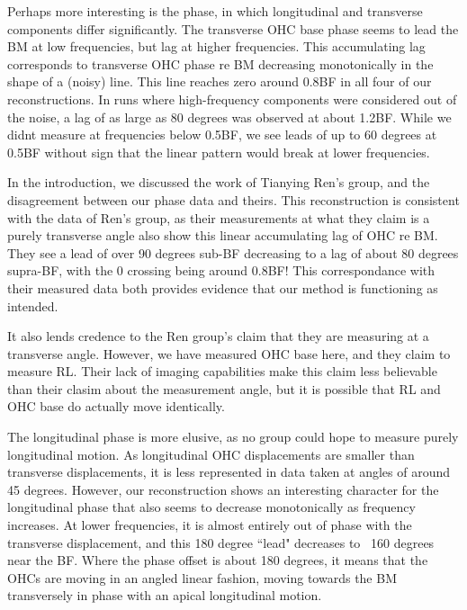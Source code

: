 \documentclass{article}
\begin{document}
\par{Perhaps more interesting is the phase, in which longitudinal and transverse components differ significantly. The transverse OHC base phase seems to lead the BM at low frequencies, but lag at higher frequencies. This accumulating lag corresponds to transverse OHC phase re BM decreasing monotonically in the shape of a (noisy) line. This line reaches zero around 0.8BF in all four of our reconstructions. In runs where high-frequency components were considered out of the noise, a lag of as large as 80 degrees was observed at about 1.2BF. While we didnt measure at frequencies below 0.5BF, we see leads of up to 60 degrees at 0.5BF without sign that the linear pattern would break at lower frequencies.}
\par{In the introduction, we discussed the work of Tianying Ren's group, and the disagreement between our phase data and theirs. This reconstruction is consistent with the data of Ren's group, as their measurements at what they claim is a purely transverse angle also show this linear accumulating lag of OHC re BM. They see a lead of over 90 degrees sub-BF decreasing to a lag of about 80 degrees supra-BF, with the 0 crossing being around 0.8BF! This correspondance with their measured data both provides evidence that our method is functioning as intended.}
\par{It also lends credence to the Ren group's claim that they are measuring at a transverse angle. However, we have measured OHC base here, and they claim to measure RL. Their lack of imaging capabilities make this claim less believable than their clasim about the measurement angle, but it is possible that RL and OHC base do actually move identically.}
\par{The longitudinal phase is more elusive, as no group could hope to measure purely longitudinal motion. As longitudinal OHC displacements are smaller than transverse displacements, it is less represented in data taken at angles of around 45 degrees. However, our reconstruction shows an interesting character for the longitudinal phase that also seems to decrease monotonically as frequency increases. At lower frequencies, it is almost entirely out of phase with the transverse displacement, and this 180 degree ``lead" decreases to ~160 degrees near the BF. Where the phase offset is about 180 degrees, it means that the OHCs are moving in an angled linear fashion, moving towards the BM transversely in phase with an apical longitudinal motion.}
\end{document}
